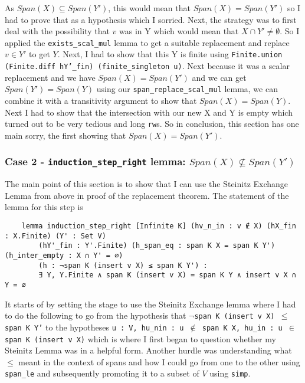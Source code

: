 \documentclass{article}
\begin{document}
As \(Span(X) \subseteq Span(Y')\), this would mean that \(Span(X) = Span (Y')\) so I had to prove that as a hypothesis which I sorried. Next, the strategy was to first deal with the possibility that \(v\) was in Y which would mean that \(X \cap Y' \not = \emptyset\). So I applied the \texttt{exists\_scal\_mul} lemma to get a suitable replacement and replace \(v \in Y'\) to get \(Y\). Next, I had to show that this Y is finite using \texttt{Finite.union (Finite.diff hY’\_fin) (finite\_singleton u)}. Next because it was a scalar replacement and we have \(Span(X) = Span(Y')\) and we can get \(Span(Y') = Span(Y)\) using our \texttt{span\_replace\_scal\_mul} lemma, we can combine it with a transitivity argument to show that \(Span(X) = Span(Y)\). Next I had to show that the intersection with our new X and Y is empty which turned out to be very tedious and long \texttt{rw}s. So in conclusion, this section has one main sorry, the first showing that \(Span(X) = Span (Y')\). 

\subsubsection{Case 2 - \texttt{induction\_step\_right} lemma: \(Span(X) \not\subseteq Span(Y')\)}
The main point of this section is to show that I can use the Steinitz Exchange Lemma from above in proof of the replacement theorem. The statement of the lemma for this step is

\begin{lstlisting}
    lemma induction_step_right [Infinite K] (hv_n_in : v ∉ X) (hX_fin : X.Finite) (Y' : Set V)
        (hY'_fin : Y'.Finite) (h_span_eq : span K X = span K Y') (h_inter_empty : X ∩ Y' = ∅)
        (h : ¬span K (insert v X) ≤ span K Y') :
        ∃ Y, Y.Finite ∧ span K (insert v X) = span K Y ∧ insert v X ∩ Y = ∅ 
\end{lstlisting}

It starts of by setting the stage to use the Steinitz Exchange lemma where I had to do the following to go from the hypothesis that \texttt{$\neg$span K (insert v X) $\leq$ span K Y'} to the hypotheses \texttt{u : V, hu\_nin : u $\notin$ span K X, hu\_in : u $\in$ span K (insert v X)} which is where I first began to question whether my Steinitz Lemma was in a helpful form. Another hurdle was understanding what $\leq$ meant in the context of spans and how I could go from one to the other using \texttt{span\_le} and subsequently promoting it to a subset of \(V\) using \texttt{simp}.
\end{document}
